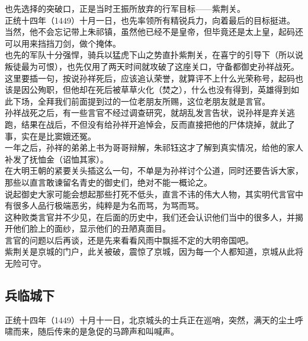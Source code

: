 \begin{multicols}{\theparacolNo}
也先选择的突破口，正是当时王振所放弃的行军目标——紫荆关。\\

正统十四年（1449）十月一日，也先率领所有精锐兵力，向着最后的目标挺进。\\

当然，他不会忘记带上朱祁镇，虽然他已经不是皇帝，但毕竟还是太上皇，起码还可以用来挡挡刀剑，做个掩体。\\

也先的军队十分强悍，骑兵以猛虎下山之势直扑紫荆关，在喜宁的引导下（所以说叛徒最为可恨），也先仅用了两天时间就攻破了这座关口，守备都御史孙祥战死。\\

这里要插一句，按说孙祥死后，应该追认荣誉，就算评不上什么光荣称号，起码也该是因公殉职，但他却在死后被草草火化（焚之），什么也没有得到，英雄得到如此下场，全拜我们前面提到过的一位老朋友所赐，这位老朋友就是言官。\\

孙祥战死之后，有一些言官不经过调查研究，就胡乱发言告状，说孙祥是弃关逃跑，结果在战后，不但没有给孙祥开追悼会，反而直接把他的尸体烧掉，就此了事，实在是比窦娥还冤。\\

一年之后，孙祥的弟弟上书为哥哥辩解，朱祁钰这才了解到真实情况，给他的家人补发了抚恤金（诏恤其家）。\\

在大明王朝的紧要关头插这么一句，不单是为孙祥讨个公道，同时还要告诉大家，那些以直言敢谏留名青史的御史们，绝对不能一概论之。\\

说起御史大家可能会想起那些打死不低头，直言不讳的伟大人物，其实明代言官中有很多人品行极端恶劣，纯粹是为名而骂，为骂而骂。\\

这种败类言官并不少见，在后面的历史中，我们还会认识他们当中的很多人，并揭开他们脸上的面纱，显示他们的丑陋真面目。\\

言官的问题以后再谈，还是先来看看风雨中飘摇不定的大明帝国吧。\\

紫荆关是京城的门户，此关被破，震惊了京城，因为每一个人都知道，京城从此将无险可守。\\

\subsection{兵临城下}
正统十四年（1449）十月十一日，北京城头的士兵正在巡哨，突然，满天的尘土呼啸而来，随后传来的是急促的马蹄声和叫喊声。\\


\end{multicols}
